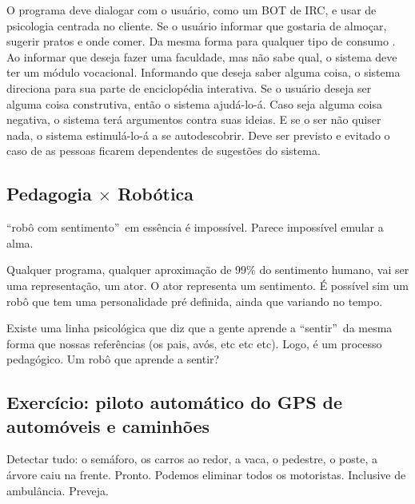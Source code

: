\documentclass[12pt,a4paper]{article}
\begin{document}
			O programa deve dialogar com o usu\'ario, como um BOT de IRC, e usar de psicologia centrada no cliente.
			Se o usu\'ario informar que gostaria de almo\c{c}ar, sugerir pratos e onde comer. Da mesma forma para qualquer tipo de consumo \cite{capital}.
			Ao informar que deseja fazer uma faculdade, mas n\~ao sabe qual, o sistema deve ter um m\'odulo vocacional.
			Informando que deseja saber alguma coisa, o sistema direciona para sua parte de enciclop\'edia interativa.
			Se o usu\'ario deseja ser alguma coisa construtiva, ent\~ao o sistema ajud\'a-lo-\'a. Caso seja alguma coisa negativa, o sistema ter\'a argumentos contra suas ideias.
			E se o ser n\~ao quiser nada, o sistema estimul\'a-lo-\'a a se autodescobrir.
			Deve ser previsto e evitado o caso de as pessoas ficarem dependentes de sugest\~oes do sistema.

    \subsection{Pedagogia $\times$ Rob\'otica}
		\begin{flushright}
		\end{flushright}

			\textquotedblleft rob\^o com sentimento\textquotedblright\, em ess\^encia \'e imposs\'ivel. Parece imposs\'ivel emular a alma.

			Qualquer programa, qualquer aproxima\c{c}\~ao de 99\% do sentimento humano, vai
 ser uma representa\c{c}\~ao, um ator. O ator representa um sentimento. \'E poss\'ivel sim um rob\^o que tem uma
personalidade pr\'e definida, ainda que variando no tempo.

Existe uma linha psicol\'ogica que diz que a gente aprende a \textquotedblleft sentir\textquotedblright\, da
mesma forma que nossas refer\^encias (os pais, av\'os, etc etc etc). Logo, \'e um processo pedag\'ogico. Um rob\^o que aprende a sentir?

    \subsection{Exerc\'icio: piloto autom\'atico do GPS de autom\'oveis e caminh\~oes}
		\begin{flushright}
		\end{flushright}

Detectar tudo: o sem\'aforo, os carros ao redor, a vaca, o pedestre, o poste, a
\'arvore caiu na frente. Pronto. Podemos eliminar todos os motoristas. Inclusive de ambul\^ancia. Preveja.
\end{document}
